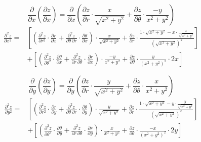 \documentclass{article}
\begin{document}
\[\frac{\partial}{\partial x}\left(\frac{\partial z}{\partial x}\right)=\frac{\partial}{\partial x}\left(\frac{\partial z}{\partial r}\cdot\frac{x}{\sqrt{x^2+y^2}}+\frac{\partial z}{\partial\theta}\cdot\frac{-y}{x^2+y^2}\right)\]
\begin{align*}\frac{\partial^2z}{\partial x^2}=&\left[\left(\frac{\partial^2z}{\partial r^2}\cdot\frac{\partial r}{\partial x}+\frac{\partial^2 z}{\partial\theta\,\partial r}\cdot\frac{\partial\theta}{\partial x}\right)\cdot\frac{x}{\sqrt{x^2+y^2}}+\frac{\partial z}{\partial r}\cdot\frac{1\cdot\sqrt{x^2+y^2}-x\cdot\frac{x}{\sqrt{x^2+y^2}}}{\left(\sqrt{x^2+y^2}\right)^2}\right]\\&+\left[\left(\frac{\partial^2z}{\partial \theta^2}\cdot\frac{\partial \theta}{\partial x}+\frac{\partial^2 z}{\partial r\,\partial \theta}\cdot\frac{\partial r}{\partial x}\right)\cdot\frac{-y}{x^2+y^2}+\frac{\partial z}{\partial\theta}\cdot\frac{y}{(x^2+y^2)^2}\cdot2x\right]\end{align*}

\[\frac{\partial}{\partial y}\left(\frac{\partial z}{\partial y}\right)=\frac{\partial}{\partial y}\left(\frac{\partial z}{\partial r}\cdot\frac{y}{\sqrt{x^2+y^2}}+\frac{\partial z}{\partial \theta}\cdot\frac{x}{x^2+y^2}\right)\]
\begin{align*}\frac{\partial^2z}{\partial y^2}=&\left[\left(\frac{\partial^2z}{\partial r^2}\cdot\frac{\partial r}{\partial y}+\frac{\partial^2 z}{\partial\theta\,\partial r}\cdot\frac{\partial\theta}{\partial y}\right)\cdot\frac{y}{\sqrt{x^2+y^2}}+\frac{\partial z}{\partial r}\cdot\frac{1\cdot\sqrt{x^2+y^2}-y\cdot\frac{y}{\sqrt{x^2+y^2}}}{\left(\sqrt{x^2+y^2}\right)^2}\right]\\&+\left[\left(\frac{\partial^2z}{\partial \theta^2}\cdot\frac{\partial \theta}{\partial y}+\frac{\partial^2 z}{\partial r\,\partial \theta}\cdot\frac{\partial r}{\partial y}\right)\cdot\frac{x}{x^2+y^2}+\frac{\partial z}{\partial\theta}\cdot\frac{-x}{(x^2+y^2)^2}\cdot2y\right]\end{align*}
\end{document}
